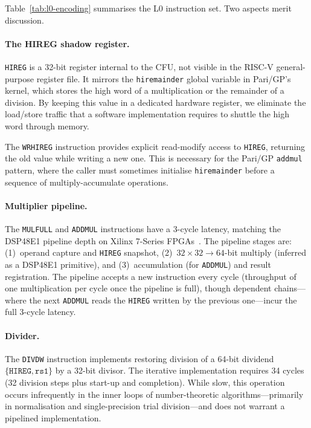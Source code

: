 \documentclass[11pt,a4paper]{article}
\begin{document}
Table~\ref{tab:l0-encoding} summarises the L0 instruction set.  Two aspects
merit discussion.

\paragraph{The HIREG shadow register.}
\texttt{HIREG} is a 32-bit register internal to the CFU, not visible in the
RISC-V general-purpose register file.  It mirrors the \texttt{hiremainder}
global variable in Pari/GP's kernel, which stores the high word of a
multiplication or the remainder of a division.  By keeping this value in a
dedicated hardware register, we eliminate the load/store traffic that a
software implementation requires to shuttle the high word through memory.

The \texttt{WRHIREG} instruction provides explicit read-modify access to
\texttt{HIREG}, returning the old value while writing a new one.  This is
necessary for the Pari/GP \texttt{addmul} pattern, where the caller must
sometimes initialise \texttt{hiremainder} before a sequence of
multiply-accumulate operations.

\paragraph{Multiplier pipeline.}
The \texttt{MULFULL} and \texttt{ADDMUL} instructions have a 3-cycle latency,
matching the DSP48E1 pipeline depth on Xilinx 7-Series FPGAs~\cite{dsp48e1ug}.
The pipeline stages are: (1)~operand capture and \texttt{HIREG} snapshot,
(2)~$32 \times 32 \to 64$-bit multiply (inferred as a DSP48E1 primitive), and
(3)~accumulation (for \texttt{ADDMUL}) and result registration.  The pipeline
accepts a new instruction every cycle (throughput of one multiplication per
cycle once the pipeline is full), though dependent chains---where the next
\texttt{ADDMUL} reads the \texttt{HIREG} written by the previous one---incur
the full 3-cycle latency.

\paragraph{Divider.}
The \texttt{DIVDW} instruction implements restoring division of a 64-bit
dividend $\{\mathtt{HIREG}, \mathtt{rs1}\}$ by a 32-bit divisor.  The
iterative implementation requires 34 cycles (32 division steps plus
start-up and completion).  While slow, this operation occurs infrequently
in the inner loops of number-theoretic algorithms---primarily in
normalisation and single-precision trial division---and does not warrant a
pipelined implementation.
\end{document}
